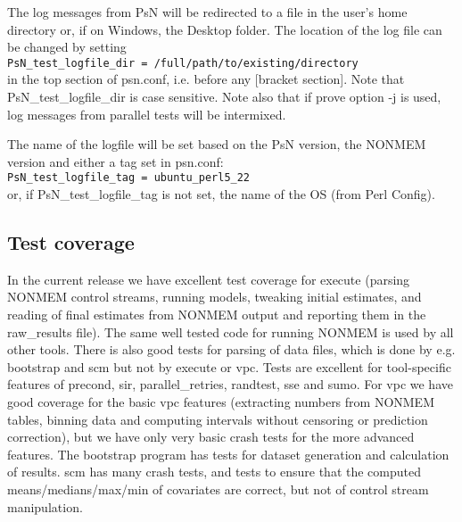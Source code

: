 The log messages from PsN will be redirected to a file in the user's home directory or, if on Windows, the
Desktop folder. The location of the log file can be changed by setting\\
\verb|PsN_test_logfile_dir = /full/path/to/existing/directory| \\
in the top section of psn.conf, i.e. before any [bracket section].
Note that PsN\_test\_logfile\_dir is case sensitive. Note also that if prove option -j is used, log messages from
parallel tests will be intermixed.

The name of the logfile will be set based on the PsN version, the NONMEM version and
either a tag set in psn.conf:\\
\verb|PsN_test_logfile_tag = ubuntu_perl5_22| \\
or, if PsN\_test\_logfile\_tag is not set, the name of the OS (from Perl Config).

\subsection{Test coverage}
In the current release we have excellent test coverage for execute (parsing NONMEM control streams, 
running models, tweaking initial estimates, and reading of final estimates from NONMEM output and reporting 
them in the raw\_results file). 
The same well tested code for running NONMEM is used by all other tools. 
There is also good tests for parsing of data files, which is done by e.g. bootstrap and scm but not by execute or
vpc.
Tests are excellent for tool-specific features of precond, sir, parallel\_retries, randtest, sse and sumo. 
For vpc we have good coverage for the basic vpc features (extracting numbers from NONMEM tables, binning data and 
computing intervals without censoring or prediction correction), but we have only very basic crash tests for the 
more advanced features. The bootstrap program has tests for dataset generation and calculation of results.
scm has many crash tests, and tests to ensure that the computed means/medians/max/min of covariates are correct, 
but not of control stream manipulation.


